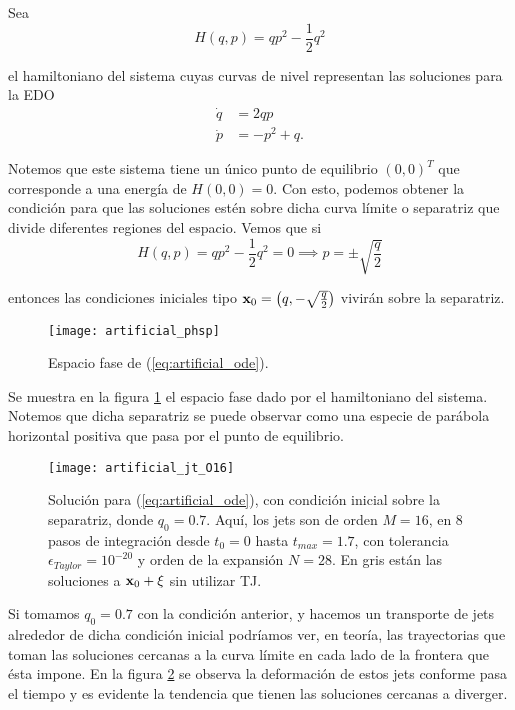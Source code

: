 Sea 
\begin{equation}
 H(q,p) = qp^2 - \frac{1}{2}q^2
 \label{eq:artificial_ham}
\end{equation}

el hamiltoniano del sistema cuyas curvas de nivel representan las soluciones para la EDO
\begin{align}
 \dot{q} &= 2qp \nonumber \\
 \dot{p} &= -p^2 + q.
 \label{eq:artificial_ode}
\end{align}


Notemos que este sistema tiene un único punto de equilibrio $(0,0)^T$ que corresponde a una energía de $H(0,0) = 0$. Con esto, podemos obtener la condición para que las soluciones estén sobre dicha curva límite o separatriz que divide diferentes regiones del espacio. Vemos que si
\begin{equation*}
 H(q,p) = qp^2 - \frac{1}{2}q^2 = 0 \implies p = \pm \sqrt{\frac{q}{2}} 
\end{equation*}

entonces las condiciones iniciales tipo $\mathbf{x}_0 = \left( q, -\sqrt{\frac{q}{2}} \right)$ vivirán sobre la separatriz. 

\begin{figure}[h!]
 \centering
 \texttt{[image: artificial\_phsp]}
 \caption{Espacio fase de (\ref{eq:artificial_ode}).}
 \label{fig:artificial_phsp}
\end{figure}

Se muestra en la figura \ref{fig:artificial_phsp} el espacio fase dado por el hamiltoniano del sistema. Notemos que dicha separatriz se puede observar como una especie de parábola horizontal positiva que pasa por el punto de equilibrio.

\begin{figure}[h!]
 \centering
 \texttt{[image: artificial\_jt\_O16]}
 \caption{Solución para (\ref{eq:artificial_ode}), con condición inicial sobre la separatriz, donde $q_0 = 0.7$. Aquí, los jets son de orden $M=16$, en $8$ pasos de integración desde $t_0 = 0$ hasta $t_{max} = 1.7$, con tolerancia $\epsilon_{Taylor} = 10^{-20}$ y orden de la expansión $N=28$. En gris están las soluciones a $\mathbf{x}_0 + \xi$ sin utilizar TJ.}
 \label{fig:artificial_jt}
\end{figure}

Si tomamos $q_0 = 0.7$ con la condición anterior, y hacemos un transporte de jets alrededor de dicha condición inicial podríamos ver, en teoría, las trayectorias que toman las soluciones cercanas a la curva límite en cada lado de la frontera que ésta impone. En la figura \ref{fig:artificial_jt} se observa la deformación de estos jets conforme pasa el tiempo y es evidente la tendencia que tienen las soluciones cercanas a diverger.

